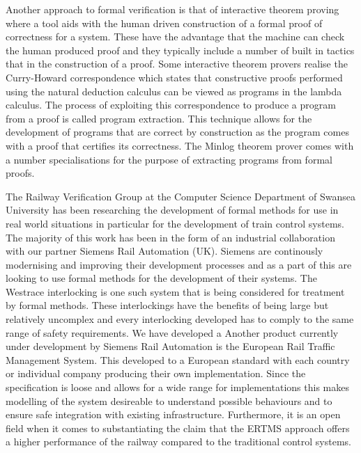 Another approach to formal verification is that of interactive theorem proving where a tool aids with the human driven construction of a formal proof of correctness for a system. These have the advantage that the machine can check the human produced proof and they typically include a number of built in tactics that in the construction of a proof. Some interactive theorem provers realise the Curry-Howard correspondence \cite{HC34, HC58, WH80} which states that constructive proofs performed using the natural deduction calculus can be viewed as programs in the lambda calculus.  The process of exploiting this correspondence to produce a program from a proof is called program extraction. This technique allows for the development of programs that are correct by construction as the program comes with a proof that certifies its correctness. The Minlog theorem prover comes with a number specialisations for the purpose of extracting programs from formal proofs.
\begin{comment}
\textbf{Note: Add something about program extraction here.}
Alternatively to automatic techniques for verification there are also interactive theorem provers which employ man-machine collaboration in order to prove properties over a system.
Program extraction is another verification technique which allows the production of correct by construction computer programs. It is based around the Curry-Howard correspondence \cite{} which states that constructive proofs performed using the natural deduction calculus can be viewed as programs in the lambda calculus. 
\end{comment}


The Railway Verification Group at the Computer Science Department of Swansea University has been researching the development of formal methods for use in real world situations in particular for the development of train control systems. The majority of this work has been in the form of an industrial collaboration with our partner Siemens Rail Automation (UK). Siemens are continously modernising and improving their development processes and as a part of this are looking to use formal methods for the development of their systems. The Westrace interlocking is one such system that is being considered for treatment by formal methods. These interlockings have the benefits of being large but relatively uncomplex and every interlocking developed has to comply to the same range of safety requirements.  We have developed a Another product currently under development by Siemens Rail Automation is the European Rail Traffic Management System. This developed to a European  standard with each country or individual company producing their own implementation. Since the specification is loose and allows for a wide range for implementations this makes modelling of the system desireable to understand possible behaviours and to ensure safe integration with existing infrastructure. Furthermore, it is an open field  when it comes to substantiating the claim that the ERTMS approach offers a higher performance of the railway compared to the traditional control systems.





